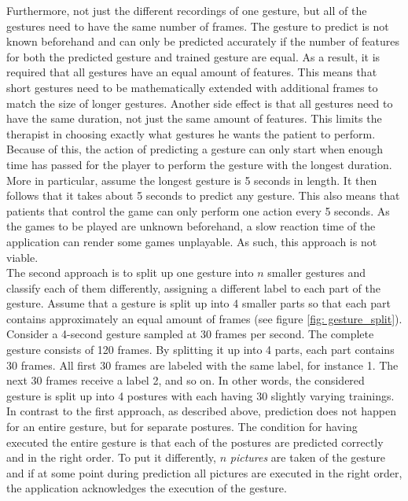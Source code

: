 Furthermore, not just the different recordings of one gesture, but all of the gestures need to have the same number of frames. The gesture to predict is not known beforehand and can only be predicted accurately if the number of features for both the predicted gesture and trained gesture are equal. As a result, it is required that all gestures have an equal amount of features. This means that short gestures need to be mathematically extended with additional frames to match the size of longer gestures. Another side effect is that all gestures need to have the same duration, not just the same amount of features. This limits the therapist in choosing exactly what gestures he wants the patient to perform. Because of this, the action of predicting a gesture can only start when enough time has passed for the player to perform the gesture with the longest duration. More in particular, assume the longest gesture is 5 seconds in length. It then follows that it takes about 5 seconds to predict any gesture. This also means that patients that control the game can only perform one action every 5 seconds. As the games to be played are unknown beforehand, a slow reaction time of the application can render some games unplayable. As such, this approach is not viable.\\

The second approach is to split up one gesture into $n$ smaller gestures and classify each of them differently, assigning a different label to each part of the gesture. Assume that a gesture is split up into 4 smaller parts so that each part contains approximately an equal amount of frames (see figure \ref{fig: gesture_split}). Consider a 4-second gesture sampled at 30 frames per second. The complete gesture consists of 120 frames. By splitting it up into 4 parts, each part contains 30 frames. All first 30 frames are labeled with the same label, for instance 1. The next 30 frames receive a label 2, and so on. In other words, the considered gesture is split up into 4 postures with each having 30 slightly varying trainings. In contrast to the first approach, as described above, prediction does not happen for an entire gesture, but for separate postures. The condition for having executed the entire gesture is that each of the postures are predicted correctly and in the right order. To put it differently, $n$ \emph{pictures} are taken of the gesture and if at some point during prediction all pictures are executed in the right order, the application acknowledges the execution of the gesture.\\

